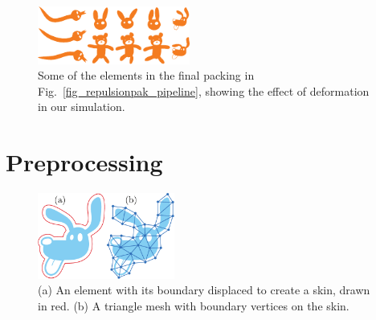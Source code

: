 \begin{figure}[h]
\centering
\includegraphics[width=5cm]{figures/repulsionpak/pipeline_defviz_csk.pdf}
\caption[Element deformation]{
	\label{fig_defviz}
	Some of the elements in the final packing in Fig.~\ref{fig_repulsionpak_pipeline}, 
	showing the effect of deformation in our simulation.
}
\end{figure}


\section{Preprocessing}

\begin{figure}[t] %
\centering
\includegraphics[width=4.5cm]{figures/repulsionpak/element_skin_triangles_2.pdf}
\caption[Element discretization]{
	\label{fig_elements_image}
	(a) An element with its boundary displaced to create a skin, drawn in red.
	(b) A triangle mesh with boundary vertices on the skin.
}
\end{figure}

